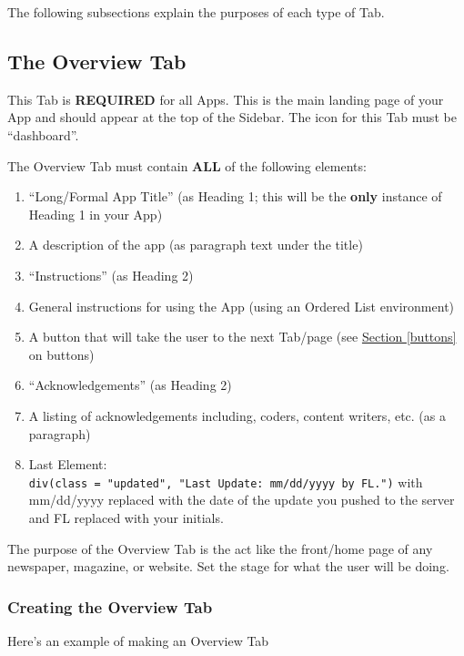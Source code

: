 \documentclass[
]{book}
\providecommand{\tightlist}{%
  \setlength{\itemsep}{0pt}\setlength{\parskip}{0pt}}
\begin{document}
The following subsections explain the purposes of each type of Tab.

\hypertarget{the-overview-tab-1}{%
\subsection{The Overview Tab}\label{the-overview-tab-1}}

This Tab is \textbf{REQUIRED} for all Apps. This is the main landing page of your App and should appear at the top of the Sidebar. The icon for this Tab must be ``dashboard''.

The Overview Tab must contain \textbf{ALL} of the following elements:

\begin{enumerate}
\def\labelenumi{\arabic{enumi}.}
\tightlist
\item
  ``Long/Formal App Title'' (as Heading 1; this will be the \textbf{only} instance of Heading 1 in your App)
\item
  A description of the app (as paragraph text under the title)
\item
  ``Instructions'' (as Heading 2)
\item
  General instructions for using the App (using an Ordered List environment)
\item
  A button that will take the user to the next Tab/page (see \protect\hyperlink{buttons}{Section \ref{buttons}} on buttons)
\item
  ``Acknowledgements'' (as Heading 2)
\item
  A listing of acknowledgements including, coders, content writers, etc. (as a paragraph)
\item
  Last Element: \texttt{div(class\ =\ "updated",\ "Last\ Update:\ mm/dd/yyyy\ by\ FL.")} with mm/dd/yyyy replaced with the date of the update you pushed to the server and FL replaced with your initials.
\end{enumerate}

The purpose of the Overview Tab is the act like the front/home page of any newspaper, magazine, or website. Set the stage for what the user will be doing.

\hypertarget{creating-the-overview-tab-1}{%
\subsubsection{Creating the Overview Tab}\label{creating-the-overview-tab-1}}

Here's an example of making an Overview Tab
\end{document}
